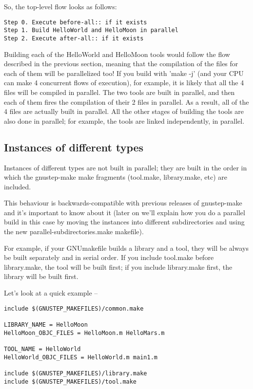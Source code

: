 \documentclass[a4paper]{article}
\begin{document}
So, the top-level flow looks as follows:

\begin{verbatim}
Step 0. Execute before-all:: if it exists
Step 1. Build HelloWorld and HelloMoon in parallel
Step 2. Execute after-all:: if it exists
\end{verbatim}

Building each of the HelloWorld and HelloMoon tools would follow the
flow described in the previous section, meaning that the compilation
of the files for each of them will be parallelized too!  If you build
with 'make -j' (and your CPU can make 4 concurrent flows of
execution), for example, it is likely that all the 4 files will be
compiled in parallel.  The two tools are built in parallel, and then
each of them fires the compilation of their 2 files in parallel.  As a
result, all of the 4 files are actually built in parallel.  All the
other stages of building the tools are also done in parallel; for
example, the tools are linked independently, in parallel.

\subsection{Instances of different types}
Instances of different types are not built in parallel; they are built
in the order in which the gnustep-make make fragments (tool.make,
library.make, etc) are included.

This behaviour is backwards-compatible with previous releases of
gnustep-make and it's important to know about it (later on we'll
explain how you do a parallel build in this case by moving the
instances into different subdirectories and using the new
parallel-subdirectories.make makefile).

For example, if your GNUmakefile builds a library and a tool, they
will be always be built separately and in serial order.  If you
include tool.make before library.make, the tool will be built first;
if you include library.make first, the library will be built first.

Let's look at a quick example --

\begin{verbatim}
include $(GNUSTEP_MAKEFILES)/common.make

LIBRARY_NAME = HelloMoon
HelloMoon_OBJC_FILES = HelloMoon.m HelloMars.m

TOOL_NAME = HelloWorld
HelloWorld_OBJC_FILES = HelloWorld.m main1.m

include $(GNUSTEP_MAKEFILES)/library.make
include $(GNUSTEP_MAKEFILES)/tool.make
\end{verbatim}
\end{document}
